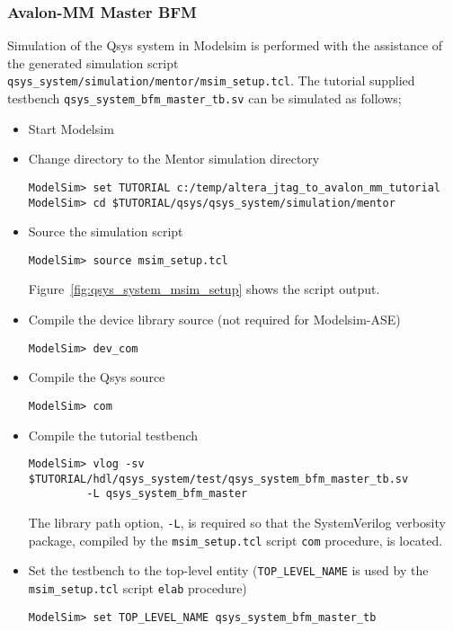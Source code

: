 \documentclass[10pt,twoside]{article}
\begin{document}
\subsubsection{Avalon-MM Master BFM}

Simulation of the Qsys system in Modelsim is performed with
the assistance of the generated simulation script
\verb+qsys_system/simulation/mentor/msim_setup.tcl+.
The tutorial supplied testbench \verb+qsys_system_bfm_master_tb.sv+
can be simulated as follows;
%
\begin{itemize}
\item Start Modelsim
\item Change directory to the Mentor simulation directory
%
\begin{verbatim}
ModelSim> set TUTORIAL c:/temp/altera_jtag_to_avalon_mm_tutorial
ModelSim> cd $TUTORIAL/qsys/qsys_system/simulation/mentor
\end{verbatim}
%
\item Source the simulation script
%
\begin{verbatim}
ModelSim> source msim_setup.tcl
\end{verbatim}
%
Figure~\ref{fig:qsys_system_msim_setup} shows the script output.
%
\item Compile the device library source (not required for Modelsim-ASE)
%
%
\begin{verbatim}
ModelSim> dev_com
\end{verbatim}
%
\item Compile the Qsys source
%
\begin{verbatim}
ModelSim> com
\end{verbatim}
%
\item Compile the tutorial testbench
%
\begin{verbatim}
ModelSim> vlog -sv $TUTORIAL/hdl/qsys_system/test/qsys_system_bfm_master_tb.sv
         -L qsys_system_bfm_master
\end{verbatim}
%
The library path option, \verb+-L+, is required so that the SystemVerilog
verbosity package, compiled by the \verb+msim_setup.tcl+ script \verb+com+
procedure, is located.
%
\item Set the testbench to the top-level entity 
(\verb+TOP_LEVEL_NAME+ is used by the \verb+msim_setup.tcl+
script \verb+elab+ procedure)
%
\begin{verbatim}
ModelSim> set TOP_LEVEL_NAME qsys_system_bfm_master_tb

\end{verbatim}
\end{itemize}
\end{document}

